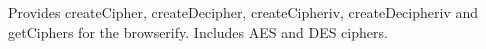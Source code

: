 \href{https://travis-ci.org/crypto-browserify/browserify-cipher}{\tt }

Provides create\+Cipher, create\+Decipher, create\+Cipheriv, create\+Decipheriv and get\+Ciphers for the browserify. Includes A\+ES and D\+ES ciphers. 
